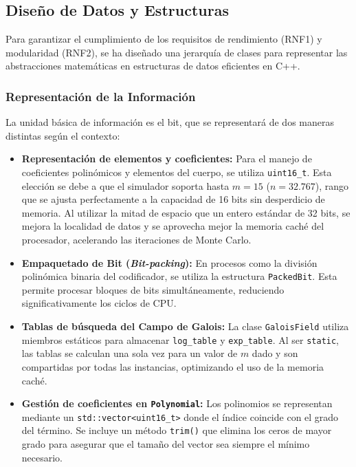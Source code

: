\subsection{Diseño de Datos y Estructuras}
\label{sub:diseno_datos}
Para garantizar el cumplimiento de los requisitos de rendimiento (RNF1) y modularidad (RNF2), se ha diseñado una jerarquía de clases para representar las abstracciones matemáticas en estructuras de datos eficientes en C++.
\subsubsection{Representación de la Información}
La unidad básica de información es el bit, que se representará de dos maneras distintas según el contexto:

\begin{itemize}
\item \textbf{Representación de elementos y coeficientes:} Para el manejo de coeficientes polinómicos y elementos del cuerpo, se utiliza \verb|uint16_t|. Esta elección se debe a que el simulador soporta hasta $m=15$ ($n=32.767$), rango que se ajusta perfectamente a la capacidad de 16 bits sin desperdicio de memoria. Al utilizar la mitad de espacio que un entero estándar de 32 bits, se mejora la localidad de datos y se aprovecha mejor la memoria caché del procesador, acelerando las iteraciones de Monte Carlo.

\item \textbf{Empaquetado de Bit (\textit{Bit-packing}):} En procesos como la división polinómica binaria del codificador, se utiliza la estructura \verb|PackedBit|. Esta permite procesar bloques de bits simultáneamente, reduciendo significativamente los ciclos de CPU.

\item \textbf{Tablas de búsqueda del Campo de Galois:} La clase \verb|GaloisField| utiliza miembros estáticos para almacenar \verb|log_table| y \verb|exp_table|. Al ser \verb|static|, las tablas se calculan una sola vez para un valor de $m$ dado y son compartidas por todas las instancias, optimizando el uso de la memoria caché.

\item \textbf{Gestión de coeficientes en \texttt{Polynomial}:} Los polinomios se representan mediante un \verb|std::vector<uint16_t>| donde el índice coincide con el grado del término. Se incluye un método \verb|trim()| que elimina los ceros de mayor grado para asegurar que el tamaño del vector sea siempre el mínimo necesario.


\end{itemize}
